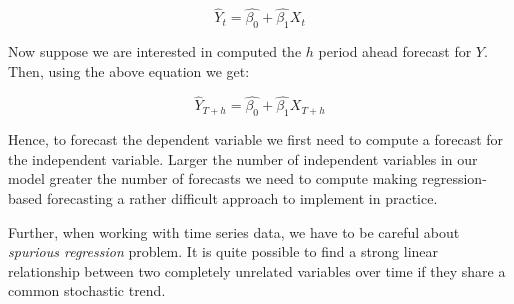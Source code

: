 \documentclass[]{book}
\theoremstyle{definition}
\theoremstyle{definition}
\theoremstyle{definition}
\theoremstyle{remark}
\begin{document}
\begin{equation}
    \widehat{Y}_t = \widehat{\beta_0} +\widehat{\beta_1} X_t
  \end{equation}

Now suppose we are interested in computed the \(h\) period ahead
forecast for \(Y\). Then, using the above equation we get:

\begin{equation}
        \widehat{Y}_{T+h} = \widehat{\beta_0} +\widehat{\beta_1} X_{T+h}
    \end{equation}

Hence, to forecast the dependent variable we first need to compute a
forecast for the independent variable. Larger the number of independent
variables in our model greater the number of forecasts we need to
compute making regression-based forecasting a rather difficult approach
to implement in practice.

Further, when working with time series data, we have to be careful about
\emph{spurious regression} problem. It is quite possible to find a
strong linear relationship between two completely unrelated variables
over time if they share a common stochastic trend.


\end{document}
